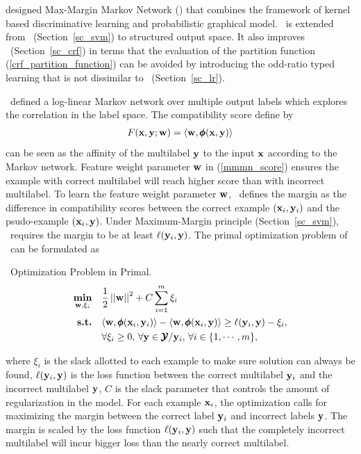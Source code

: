 {\citet{Taskar04max} designed Max-Margin Markov Network (\mmmn) that combines the framework of kernel based discriminative learning and probabilistic graphical model.
\mmmn\ is extended from \svm\ (Section~\ref{sc_svm}) to structured output space.
It also improves \crf\ (Section~\ref{sc_crf}) in terms that the evaluation of the partition function (\ref{crf_partition_function}) can be avoided by introducing the odd-ratio typed learning that is not dissimilar to \lr\ (Section~\ref{sc_lr}).

\mmmn\ defined a log-linear Markov network over multiple output labels which explores the correlation in the label space.
The compatibility score define by 
\begin{align}
	F(\mathbf {x},\mathbf {y};\mathbf {w}) = \langle \mathbf {w}, \pmb \phi(\mathbf {x},\mathbf {y}) \rangle \label{mmmn_score}
\end{align}
can be seen as the affinity of the multilabel $\mathbf {y}$ to the input $\mathbf {x}$ according to the Markov network.
Feature weight parameter $\mathbf {w}$ in (\ref{mmmn_score}) ensures the example with correct multilabel will reach higher score than with incorrect multilabel.
To learn the feature weight parameter $\mathbf {w}$, \mmmn\ defines the margin as the difference in compatibility scores between the correct example $(\mathbf {x}_i,\mathbf {y}_i)$ and the psudo-example $(\mathbf {x}_i,\mathbf {y})$.
Under Maximum-Margin principle (Section~\ref{sc_svm}), \mmmn\ requires the margin to be at least $\mathbf {\ell}(\mathbf {y}_i,{\mathbf {y}})$.
The primal optimization problem of \mmmn\ can be formulated as
\begin{definition}{\mmmn\ Optimization Problem in Primal.}\label{def_mmmn}
	\begin{align*}
		\underset{\mathbf {w},\mathbf{\xi}_i}{\textbf{min}} & \quad\frac{1}{2}\left|\left| \mathbf {w} \right|\right|^2 + C\sum_{i=1}^{m}\xi_i \\
		\textbf{s.t.} & \quad\langle \mathbf {w}, \pmb \phi(\mathbf {x}_i,\mathbf {y}_i) \rangle - \langle \mathbf {w}, \pmb \phi(\mathbf {x}_i,\mathbf {y}) \rangle \ge \mathbf {\ell}(\mathbf {y}_i,\mathbf {y})-\xi_i,\\
		& \quad \forall \xi_i\ge0,\, \forall \mathbf {y}\in\pmb {\mathcal{Y}}/\mathbf {y}_i,\, \forall i\in\{1,\cdots,m\},
	\end{align*}
\end{definition}
where $\xi_i$ is the slack allotted to each example to make sure solution can always be found, $\mathbf {\ell}(\mathbf {y}_i,\mathbf {y})$ is the loss function between the correct multilabel $\mathbf {y}_i$ and the incorrect multilabel $\mathbf {y}$, $C$ is the slack parameter that controls the amount of regularization in the model.
For each example $\mathbf {x}_i$, the optimization calls for maximizing the margin between the correct label $\mathbf {y}_i$ and incorrect labels $\mathbf {y}$.
The margin is scaled by the loss function $\mathbf {\ell}(\mathbf {y}_i,{\mathbf {y}})$ such that the completely incorrect multilabel will incur bigger loss than the nearly correct multilabel.


}
